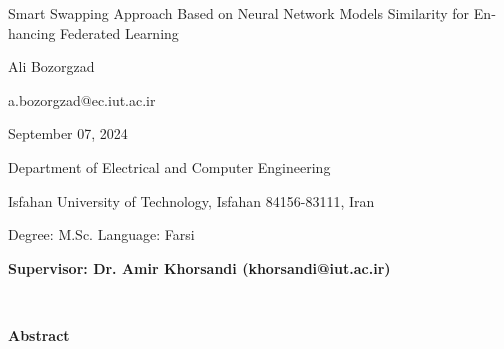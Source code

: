 \thispagestyle{empty}

\begin{latin}
\begin{center}

{\huge
Smart Swapping Approach Based on Neural Network Models Similarity for Enhancing Federated Learning
}

\vspace{1cm}

{\LARGE{Ali Bozorgzad}}

\vspace{0.2cm}

{\small a.bozorgzad@ec.iut.ac.ir}

\vspace{0.5cm}

September 07, 2024

\vspace{0.5cm}

Department of Electrical and Computer Engineering

\vspace{0.2cm}

Isfahan University of Technology, Isfahan 84156-83111, Iran

\vspace{0.2cm}

Degree: M.Sc. \hspace*{3cm} Language: Farsi

\vspace{1cm}

{\small\textbf{Supervisor: Dr. Amir Khorsandi (khorsandi@iut.ac.ir)}}
\end{center}
~\vfill



\noindent\textbf{Abstract}


\end{latin}
